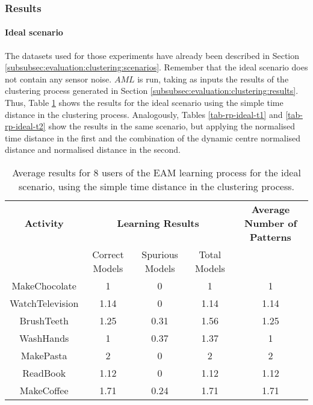 \subsubsection{Results}
\label{subsubsec:evaluation:eam:results}

\paragraph*{Ideal scenario}

The datasets used for those experiments have already been described in Section \ref{subsubsec:evaluation:clustering:scenarios}. Remember that the ideal scenario does not contain any sensor noise. $AML$ is run, taking as inputs the results of the clustering process generated in Section \ref{subsubsec:evaluation:clustering:results}. Thus, Table \ref{tab-rp-ideal-t0} shows the results for the ideal scenario using the simple time distance in the clustering process. Analogously, Tables \ref{tab-rp-ideal-t1} and \ref{tab-rp-ideal-t2} show the results in the same scenario, but applying the normalised time distance in the first and the combination of the dynamic centre normalised distance and normalised distance in the second. 


\begin{table}[htbp]\scriptsize
  \begin{center}
        \begin{tabular}{ccccc}
            \hline            
            \textbf{Activity} & \multicolumn{3}{c}{\textbf{Learning Results}} & \textbf{Average Number of Patterns} \\
             & Correct Models & Spurious Models & Total Models & \\
            \hline
            MakeChocolate   & 1    & 0     & 1  & 1 \\
	    WatchTelevision & 1.14 & 0     & 1.14  & 1.14    \\
	    BrushTeeth      & 1.25 & 0.31  & 1.56  & 1.25 \\
	    WashHands       & 1    & 0.37  & 1.37  & 1 \\
	    MakePasta       & 2    & 0     & 2  & 2 \\
	    ReadBook        & 1.12 & 0     & 1.12  & 1.12  \\
	    MakeCoffee      & 1.71 & 0.24  & 1.71  & 1.71  \\
            \hline
        \end{tabular}
        \caption{Average results for 8 users of the EAM learning process for the ideal scenario, using the simple time distance in the clustering process.}
        \label{tab-rp-ideal-t0}
    \end{center}
\end{table}



